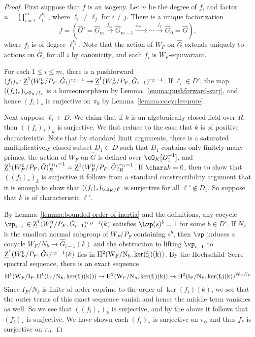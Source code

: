 \begin{proof}
    First suppose that $f$ is an isogeny. Let $n$ be the degree of $f$, and factor $n = \prod_{i=1}^m \ell_i^{k_i}$, where $\ell_i \neq \ell_j$ for $i \neq j$. There is a unique factorization
    \[
    f = \left( \hat{G}' = \hat{G}_m \xrightarrow[]{f_m} \hat{G}_{m-1} \xrightarrow[]{f_{m-1}} \cdots \xrightarrow[]{f_1} \hat{G}_0 = \hat{G} \right),
    \]
    where $f_i$ is of degree $\ell_i^{k_i}$. Note that the action of $W_F$ on $\hat{G}$ extends uniquely to actions on $\hat{G}_i$ for all $i$ by canonicity, and each $f_i$ is $W_F$-equivariant. \smallskip
    
    For each $1 \leq i \leq m$, there is a pushforward $(f_i)_*\colon\underline{\rm{Z}}^1(W_F^0/P_F, \hat{G}_i)^{r_D = 1} \to \underline{\rm{Z}}^1(W_F^0/P_F, \hat{G}_{i - 1})^{r_D = 1}$. If $\ell_i \in D'$, the map $((f_i)_*)_{\cO_K/\ell_i}$ is a homeomorphism by Lemma~\ref{lemma:pushforward-surj}, and hence $(f_i)_*$ is surjective on $\pi_0$ by Lemma~\ref{lemma:cocycles-pure}.\smallskip
    
    Next suppose $\ell_i \in D$. We claim that if $k$ is an algebraically closed field over $R$, then $((f_i)_*)_k$ is surjective. We first reduce to the case that $k$ is of positive characteristic. Note that by standard limit arguments, there is a saturated multiplicatively closed subset $D_1 \subset D$ such that $D_1$ contains only finitely many primes, the action of $W_F$ on $\hat{G}$ is defined over $\cO_K[D_1^{-1}]$, and $\underline{\rm{Z}}^1(W_F^0/P_F, \hat{G})^{r_{D_1} = 1}_R = \underline{\rm{Z}}^1(W_F^0/P_F, \hat{G})^{r_D = 1}_R$. If $\chara k = 0$, then to show that $((f_i)_*)_k$ is surjective it follows from a standard constructibility argument that it is enough to show that $((f_i)_*)_{\cO_K/\ell'}$ is surjective for all $\ell' \not\in D_1$. So suppose that $k$ is of characteristic $\ell'$.\smallskip
    
    By Lemma~\ref{lemma:bounded-order-of-inertia} and the definitions, any cocycle $\vp_{i-1} \in \underline{\rm{Z}}^1(W_F^0/P_F, \hat{G}_{i - 1})^{r_D = 1}(k)$ satisfies $\Lvp(s)^b = 1$ for some $b \in D'$. If $N_b$ is the smallest normal subgroup of $W_F/P_F$ containing $s^b$, then $\vp$ induces a cocycle $W_F/N_b \to \hat{G}_{i-1}(k)$ and the obstruction to lifting $\vp_{i-1}$ to $\underline{\rm{Z}}^1(W_F^0/P_F, \hat{G}_i)^{r_D = 1}(k)$ lies in $\rm{H}^2(W_F/N_b, \ker(f_i)(k))$. By the Hochschild--Serre spectral sequence, there is an exact sequence
    \[
    \rm{H}^1(W_F/I_F, \rm{H}^1(I_F/N_b, \ker(f_i)(k))) \to \rm{H}^2(W_F/N_b, \ker(f_i)(k)) \to \rm{H}^2(I_F/N_b, \ker(f_i)(k))^{W_F/I_F}
    \]
    Since $I_F/N_b$ is finite of order coprime to the order of $\ker(f_i)(k)$, we see that the outer terms of this exact sequence vanish and hence the middle term vanishes as well. So we see that $((f_i)_*)_k$ is surjective, and by the above it follows that $(f_i)_*$ is surjective. We have shown each $(f_i)_*$ is surjective on $\pi_0$ and thus $f_*$ is surjective on $\pi_0$.\smallskip


\end{proof}
